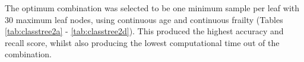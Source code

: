 \documentclass[../thesis.tex]{subfiles}
\begin{document}
The optimum combination was selected to be one minimum sample per leaf with 30 maximum leaf nodes, using continuous age and continuous frailty (Tables \ref{tab:classtree2a} - \ref{tab:classtree2d}). This produced the highest accuracy and recall score, whilst also producing the lowest computational time out of the combination.

\begin{table}[h!]
\begin{subtable}{.49\linewidth}
    \centering{}
    \caption{Accuracy score.}
    \label{tab:classtree1a}
    \end{subtable}
\begin{subtable}{.5\linewidth}
  

\end{subtable}
\end{table}
\end{document}
